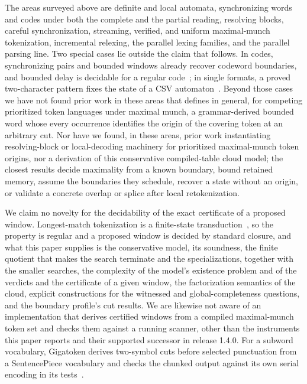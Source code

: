 \documentclass[11pt,a4paper]{article}
\theoremstyle{definition}
\theoremstyle{plain}
\begin{document}
The areas surveyed above are definite and local automata, synchronizing words and codes under both the complete and the
partial reading, resolving blocks, careful synchronization, streaming, verified, and uniform maximal-munch tokenization,
incremental relexing, the parallel lexing families, and the parallel parsing line. Two special cases lie outside the
claim that follows. In codes, synchronizing pairs and bounded windows already recover codeword boundaries, and bounded
delay is decidable for a regular code~\cite{lassez1976messages, restivo1975synchronization, fici2025morphisms}; in
single formats, a proved two-character pattern fixes the state of a CSV automaton~\cite{ge2019csv}. Beyond those cases
we have not found prior work in these areas that defines in general, for competing prioritized token languages under
maximal munch, a grammar-derived bounded word whose every occurrence identifies the origin of the covering token at an
arbitrary cut. Nor have we found, in these areas, prior work instantiating resolving-block or local-decoding machinery
for prioritized maximal-munch token origins, nor a derivation of this conservative compiled-table cloud model; the
closest results decide maximality from a known boundary, bound retained memory, assume the boundaries they schedule,
recover a state without an origin, or validate a concrete overlap or splice after local retokenization.

We claim no novelty for the decidability of the exact certificate of a proposed window. Longest-match tokenization is a
finite-state transduction~\cite{karttunen1996directed}, so the property is regular and a proposed window is decided by
standard closure, and what this paper supplies is the conservative model, its soundness, the finite quotient that makes
the search terminate and the specializations, together with the smaller searches, the complexity of the model's
existence problem and of the verdicts and the certificate of a given window, the factorization semantics of the cloud,
explicit constructions for the witnessed and global-completeness questions, and the boundary profile's cut results. We
are likewise not aware of an implementation that derives certified windows from a compiled maximal-munch token set and
checks them against a running scanner, other than the instruments this paper reports and their supported successor in
release 1.4.0. For a subword vocabulary, Gigatoken derives two-symbol cuts before selected punctuation from a
SentencePiece vocabulary and checks the chunked output against its own serial encoding in its
tests~\cite{rod2026gigatoken}.
\end{document}
